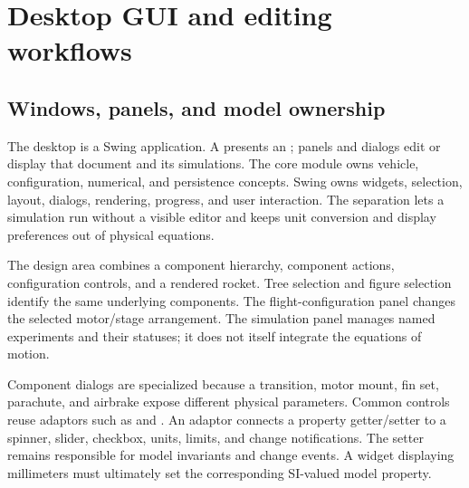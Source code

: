 \chapter{Desktop GUI and editing workflows}\label{ch:gui}
\section{Windows, panels, and model ownership}
The desktop is a Swing application. A  presents an ; panels and dialogs edit or display that document and its simulations. The core module owns vehicle, configuration, numerical, and persistence concepts. Swing owns widgets, selection, layout, dialogs, rendering, progress, and user interaction. The separation lets a simulation run without a visible editor and keeps unit conversion and display preferences out of physical equations.


The design area combines a component hierarchy, component actions, configuration controls, and a rendered rocket. Tree selection and figure selection identify the same underlying components. The flight-configuration panel changes the selected motor/stage arrangement. The simulation panel manages named experiments and their statuses; it does not itself integrate the equations of motion.

Component dialogs are specialized because a transition, motor mount, fin set, parachute, and airbrake expose different physical parameters. Common controls reuse adaptors such as  and . An adaptor connects a property getter/setter to a spinner, slider, checkbox, units, limits, and change notifications. The setter remains responsible for model invariants and change events. A widget displaying millimeters must ultimately set the corresponding SI-valued model property.

